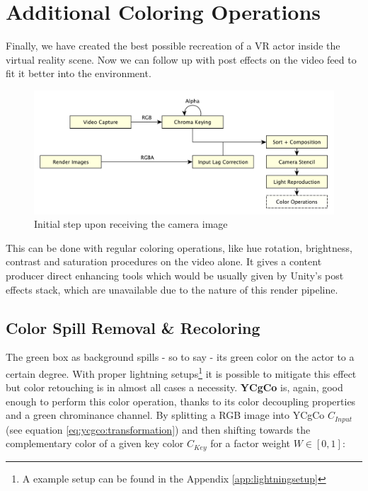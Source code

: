 %
\section{Additional Coloring Operations}

Finally, we have created the best possible recreation of a VR actor inside the 
virtual reality scene. Now we can follow up with post effects on the video feed 
to fit it better into the environment.

\begin{figure}[htb]
	\includegraphics[width=\textwidth]{gfx/pipeline/4_8_color.pdf}
	\caption{Initial step upon receiving the camera image}
	\label{fig:steps:recolor}
\end{figure}

This can be done with regular coloring operations, like hue rotation, 
brightness, contrast and saturation procedures on the video alone. It gives a 
content producer direct enhancing tools which would be usually given by Unity's 
post effects stack, which are unavailable due to the nature of this render 
pipeline.

\subsection{Color Spill Removal \& Recoloring}

The green box as background spills - so to say - its green color on the actor 
to a certain degree. With proper lightning setups\footnote{A example setup can 
be found in the Appendix \ref{app:lightningsetup}} it is possible to mitigate 
this effect but color retouching is in almost all cases a necessity. 
\textbf{YCgCo} is, again, good enough to perform this color operation, thanks 
to its color decoupling properties and a green chrominance channel. By 
splitting a RGB image into YCgCo $C_{Input}$ (see equation 
\eqref{eq:ycgco:transformation}) and then shifting towards the complementary 
color of a given key color $C_{Key}$ for a factor weight $W \in [0, 1]$:


